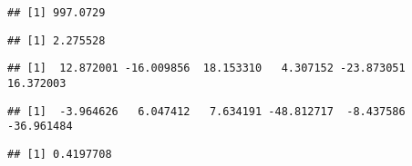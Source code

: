 \documentclass[
]{article}
\newenvironment{Shaded}{\begin{snugshade}}{\end{snugshade}}
\newcommand{\CommentTok}[1]{\textcolor[rgb]{0.56,0.35,0.01}{\textit{#1}}}
\newcommand{\FunctionTok}[1]{\textcolor[rgb]{0.13,0.29,0.53}{\textbf{#1}}}
\newcommand{\NormalTok}[1]{#1}
\newcommand{\SpecialCharTok}[1]{\textcolor[rgb]{0.81,0.36,0.00}{\textbf{#1}}}
\begin{document}
\begin{verbatim}
## [1] 997.0729
\end{verbatim}

\begin{Shaded}
\end{Shaded}

\begin{verbatim}
## [1] 2.275528
\end{verbatim}

\begin{Shaded}
\end{Shaded}

\begin{verbatim}
## [1]  12.872001 -16.009856  18.153310   4.307152 -23.873051  16.372003
\end{verbatim}

\begin{Shaded}
\end{Shaded}

\begin{verbatim}
## [1]  -3.964626   6.047412   7.634191 -48.812717  -8.437586 -36.961484
\end{verbatim}

\begin{Shaded}
\end{Shaded}

\begin{verbatim}
## [1] 0.4197708
\end{verbatim}

\begin{Shaded}
\end{Shaded}
\end{document}

